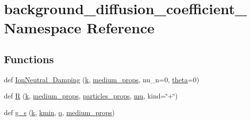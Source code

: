 \hypertarget{namespacebackground__diffusion__coefficient__2}{}\section{background\+\_\+diffusion\+\_\+coefficient\+\_ Namespace Reference}
\label{namespacebackground__diffusion__coefficient__2}
\subsection*{Functions}
\begin{DoxyCompactItemize}
\item 
def \hyperlink{namespacebackground__diffusion__coefficient__2_a788d35f99dde8484595c8cda404e4ae3}{Ion\+Neutral\+\_\+\+Damping} (\hyperlink{namespacebackground__diffusion__coefficient__2_a5a09d109413176dd193dca9b7a470f60}{k}, \hyperlink{namespacebackground__diffusion__coefficient__2_aa9379babe1c7668f0292249401d84e24}{medium\+\_\+props}, nu\+\_\+n=0, \hyperlink{cr__source_8h_a91a3bf9ce71325c8a7cbd31d8c474bff}{theta}=0)
\item 
def \hyperlink{namespacebackground__diffusion__coefficient__2_ad7cd32146141458bdf67d94b065b65db}{R} (\hyperlink{namespacebackground__diffusion__coefficient__2_a5a09d109413176dd193dca9b7a470f60}{k}, \hyperlink{namespacebackground__diffusion__coefficient__2_aa9379babe1c7668f0292249401d84e24}{medium\+\_\+props}, \hyperlink{namespacebackground__diffusion__coefficient__2_a575a4b15f89160acdbfbdec4a07f18b8}{particles\+\_\+props}, \hyperlink{namespacebackground__diffusion__coefficient__2_aa8a6e6346b658dee376c128e3eacd98d}{mu}, kind=\char`\"{}+\char`\"{})
\item 
def \hyperlink{namespacebackground__diffusion__coefficient__2_a8618eb756a0334c85d5685ba59d75e90}{g\+\_\+s} (\hyperlink{namespacebackground__diffusion__coefficient__2_a5a09d109413176dd193dca9b7a470f60}{k}, \hyperlink{namespacebackground__diffusion__coefficient__2_ae4628955a57750924b16e9536fa296bc}{kmin}, \hyperlink{namespacebackground__diffusion__coefficient__2_a7bd6101496be3edb3360a74d65a9798f}{q}, \hyperlink{namespacebackground__diffusion__coefficient__2_aa9379babe1c7668f0292249401d84e24}{medium\+\_\+props})
\end{DoxyCompactItemize}
